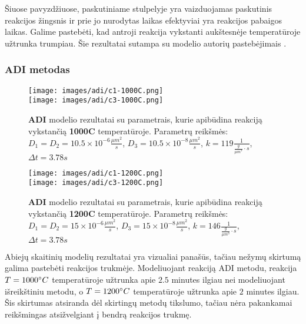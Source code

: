 Šiuose pavyzdžiuose, paskutiniame stulpelyje yra vaizduojamas paskutinis reakcijos žingsnis ir prie jo nurodytas laikas efektyviai yra reakcijos pabaigos laikas. Galime pastebėti, kad antroji reakcija vykstanti aukštesnėje temperatūroje užtrunka trumpiau. Šie rezultatai sutampa su modelio autorių pastebėjimais \cite{mackeviciusCloserLookComputer2012}.

\subsubsection{ADI metodas}

\begin{figure}[h!]
  \centering
  \texttt{[image: images/adi/c1-1000C.png]} \\ 
  \texttt{[image: images/adi/c3-1000C.png]}
  \caption{\textbf{ADI} modelio rezultatai su parametrais, kurie apibūdina reakciją vykstančią \textbf{1000\degree C} temperatūroje. Parametrų reikšmės: $D_1 = D_2 = 10.5\times 10^{-6} \frac{\mu m^2}{s}$, $D_3 = 10.5\times 10^{-8} \frac{\mu m^2}{s}$, $k = 119 \frac{1}{ \frac{g}{\mu m^3}\cdot s}$, $\Delta t = 3.78s$}
  \label{fig:adi-result-T-1000}
\end{figure}

\begin{figure}[h!]
  \centering
  \texttt{[image: images/adi/c1-1200C.png]} \\ 
  \texttt{[image: images/adi/c3-1200C.png]}
  \caption{\textbf{ADI} modelio rezultatai su parametrais, kurie apibūdina reakciją vykstančią \textbf{1200\degree C} temperatūroje. Parametrų reikšmės: $D_1 = D_2 = 15\times 10^{-6} \frac{\mu m^2}{s}$, $D_3 = 15\times 10^{-8} \frac{\mu m^2}{s}$, $k = 146 \frac{1}{ \frac{g}{\mu m^3}\cdot s}$, $\Delta t = 3.78s$}
  \label{fig:adi-result-T-1200}
\end{figure}

Abiejų skaitinių modelių rezultatai yra vizualiai panašūs, tačiau nežymų skirtumą galima pastebėti reakcijos trukmėje. Modeliuojant reakciją ADI metodu, reakcija $T=1000\degree C$ temperatūroje užtrunka apie $2.5$ minutes ilgiau nei modeliuojant išreikštiniu metodu, o $T=1200\degree C$ temperatūroje užtrunka apie $2$ minutes ilgiau. Šis skirtumas atsiranda dėl skirtingų metodų tikslumo, tačiau nėra pakankamai reikšmingas atsižvelgiant į bendrą reakcijos trukmę.
